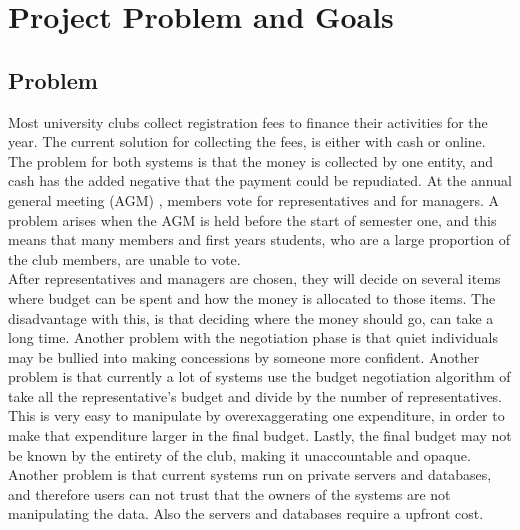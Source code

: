 \chapter{Project Problem and Goals} \label{Chapter: Project Problem and Goals}
\section{Problem}
Most university clubs collect registration fees to finance their activities for the year. The current solution for collecting the fees, is either with cash or online. The problem for both systems is that the money is collected by one entity, and cash has the added negative that the payment could be repudiated. At the annual general meeting  (AGM) , members vote for representatives and for managers. A problem arises when the AGM is held before the start of semester one, and this means that many members and first years students, who are a large proportion of the club members, are unable to vote. \\
After representatives and managers are chosen, they will decide on several items where budget can be spent and how the money is allocated to those items. The disadvantage with this, is that deciding where the money should go, can take a long time. Another problem with the negotiation phase is that quiet individuals may be bullied into making concessions by someone more confident. Another problem is that currently a lot of systems use the budget negotiation algorithm of take all the representative’s budget and divide by the number of representatives. This is very easy to manipulate by overexaggerating one expenditure, in order to make that expenditure larger in the final budget. Lastly, the final budget may not be known by the entirety of the club, making it unaccountable and opaque. \\
Another problem is that current systems run on private servers and databases, and therefore users can not trust that the owners of the systems are not manipulating the data. Also the servers and databases require a upfront cost.
